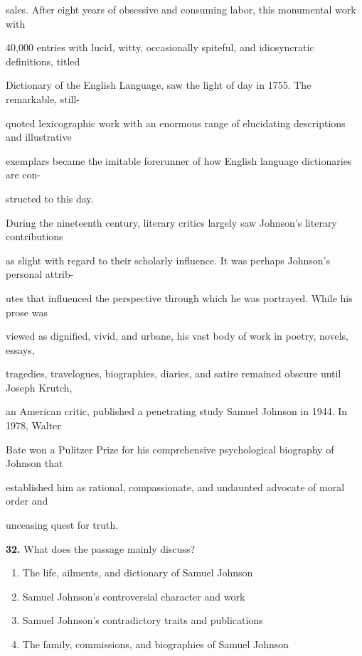 \documentclass[12pt]{article}
\begin{document}
sales. After eight years of obsessive and consuming labor, this monumental work with\par
40,000 entries with lucid, witty, occasionally spiteful, and idiosyncratic definitions, titled\par
Dictionary of the English Language, saw the light of day in 1755. The remarkable, still-\par
quoted lexicographic work with an enormous range of elucidating descriptions and illustrative\par
exemplars became the imitable forerunner of how English language dictionaries are con-\par
structed to this day.\par
During the nineteenth century, literary critics largely saw Johnson's literary contributions\par
as slight with regard to their scholarly influence. It was perhaps Johnson's personal attrib-\par
utes that influenced the perspective through which he was portrayed. While his prose was\par
viewed as dignified, vivid, and urbane, his vast body of work in poetry, novels, essays,\par
tragedies, travelogues, biographies, diaries, and satire remained obscure until Joseph Krutch,\par
an American critic, published a penetrating study Samuel Johnson in 1944. In 1978, Walter\par
Bate won a Pulitzer Prize for his comprehensive psychological biography of Johnson that\par
established him as rational, compassionate, and undaunted advocate of moral order and\par
unceasing quest for truth.\par
\endgroup
\medskip
\noindent\textbf{32.} What does the passage mainly discuss?
\begin{enumerate}[label=(\Alph*),leftmargin=*,itemsep=0.2em]
\item The life, ailments, and dictionary of Samuel Johnson
\item Samuel Johnson's controversial character and work
\item Samuel Johnson's contradictory traits and publications
\item The family, commissions, and biographies of Samuel Johnson
\end{enumerate}
\par
\vspace{0.25\baselineskip}
\end{document}
